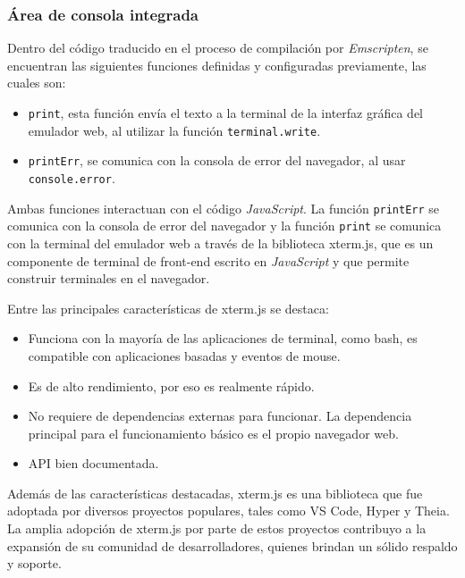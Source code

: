 \subsubsection{Área de consola integrada}

Dentro del código traducido en el proceso de compilación por \textit{Emscripten}, se encuentran las siguientes funciones definidas y configuradas previamente, las cuales son: 

\begin{itemize}
\item \texttt{print}, esta función envía el texto a la terminal de la interfaz gráfica del emulador web, al utilizar la función \texttt{terminal.write}.
\item \texttt{printErr}, se comunica con la consola de error del navegador, al usar \newline \texttt{console.error}.
\end{itemize}

Ambas funciones interactuan con el código \textit{JavaScript}. La función \texttt{printErr} se comunica con la consola de error del navegador y la función \texttt{print} se comunica con la terminal del emulador web a través de la biblioteca xterm.js, que es un componente de terminal de front-end escrito en \textit{JavaScript} y que permite construir terminales en el navegador. 

Entre las principales características de xterm.js se destaca:

\begin{itemize}
	\item Funciona con la mayoría de las aplicaciones de terminal, como bash, es compatible con aplicaciones basadas y eventos de mouse.
	\item Es de alto rendimiento, por eso es realmente rápido.
	\item No requiere de dependencias externas para funcionar. La dependencia principal para el funcionamiento básico es el propio navegador web.
	\item API bien documentada.
\end{itemize}

Además de las características destacadas, xterm.js es una biblioteca que fue adoptada por diversos proyectos populares, tales como VS Code, Hyper y Theia. La amplia adopción de xterm.js por parte de estos proyectos contribuyo a la expansión de su comunidad de desarrolladores, quienes brindan un sólido respaldo y soporte.

